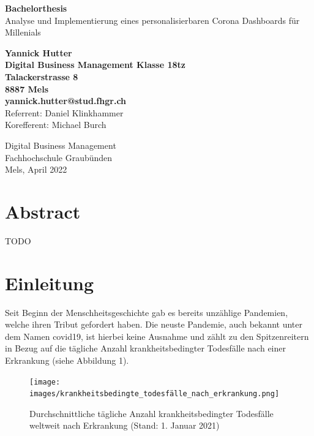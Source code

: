 \documentclass[12pt, oneside]{article}
\begin{document}
\begin{titlepage}
	\begin{center}
		\Huge
		\textbf{Bachelorthesis}\\
		\vspace{0.5cm}
		\LARGE
		Analyse und Implementierung eines personalisierbaren Corona Dashboards für Millenials

		\vspace{1.5cm}
		\normalsize
		\textbf{Yannick Hutter}\\
		\textbf{Digital Business Management Klasse 18tz}\\
		\textbf{Talackerstrasse 8}\\
		\textbf{8887 Mels}\\
		\textbf{yannick.hutter@stud.fhgr.ch}\\


		\vfill
		Referrent: Daniel Klinkhammer\\
		Korefferent: Michael Burch\\

		\vspace{0.8cm}


		Digital Business Management\\
		Fachhochschule Graubünden\\
		Mels, April 2022
	\end{center}
\end{titlepage}

\clearpage
\section*{Abstract}
TODO


\clearpage
\tableofcontents

\clearpage
\listoffigures
\listoftables

\clearpage
\printglossaries


\clearpage
\section{Einleitung}
Seit Beginn der Menschheitsgeschichte gab es bereits unzählige Pandemien, welche ihren Tribut gefordert haben. Die neuste Pandemie, auch bekannt unter dem Namen \Gls{covid19}, ist hierbei keine Ausnahme und zählt zu den Spitzenreitern in Bezug auf die tägliche Anzahl krankheitsbedingter Todesfälle nach einer Erkrankung (siehe Abbildung 1).

\begin{figure}[ht]
    \texttt{[image: images/krankheitsbedingte\_todesfälle\_nach\_erkrankung.png]}
    \centering
    \caption{Durchschnittliche tägliche Anzahl krankheitsbedingter Todesfälle weltweit nach Erkrankung (Stand:
1. Januar 2021) ~\citep[S. 12]{worldwide_epidemic_cases_study}}
\end{figure}
\end{document}
